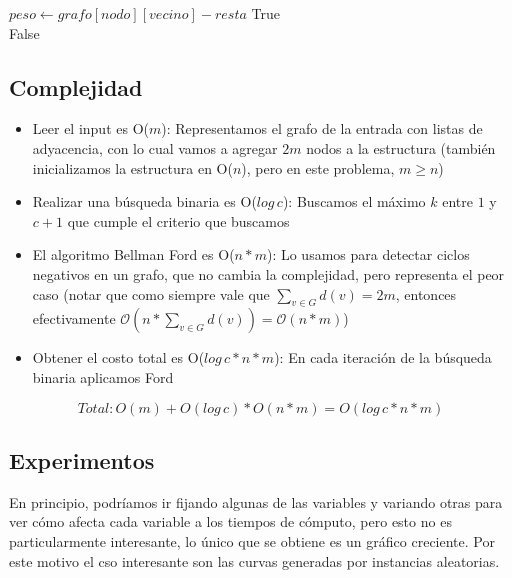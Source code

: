 \begin{algorithm}[H]
\begin{algorithmic}
    
	    
		    
			\State $peso \gets grafo[nodo][vecino] - resta$    
			    
				\State \Return True      \\
			\EndIf
		\EndFor
	\EndFor
	\Return False    
\EndFunction
\end{algorithmic}
\end{algorithm}

\newpage

\subsection{Complejidad}

\begin{itemize}
	\item Leer el input es O($m$): Representamos el grafo de la entrada con listas de adyacencia, con lo cual vamos a agregar $2m$ nodos a la estructura (también inicializamos la estructura en O($n$), pero en este problema, $m \geq n$)
	\item Realizar una búsqueda binaria es O($log \, c$): Buscamos el máximo $k$ entre $1$ y $c+1$ que cumple el criterio que buscamos
	\item El algoritmo Bellman Ford es O($n*m$): Lo usamos para detectar ciclos negativos en un grafo, que no cambia la complejidad, pero representa el peor caso (notar que como siempre vale que $\sum_{v \in G} d(v) = 2m$, entonces efectivamente $\mathcal{O}(n*\sum_{v \in G} d(v)) = \mathcal{O}(n*m)$)
	\item Obtener el costo total es O($log \, c *n*m$): En cada iteración de la búsqueda binaria aplicamos Ford
\end{itemize}

$$Total:  O(m) + O(log \, c) * O(n*m) = O(log \, c *n*m) $$

\subsection{Experimentos}

En principio, podríamos ir fijando algunas de las variables y variando otras para ver cómo afecta cada variable a los tiempos de cómputo, pero esto no es particularmente interesante, lo único que se obtiene es un gráfico creciente. Por este motivo el cso interesante son las curvas generadas por instancias aleatorias.\\

